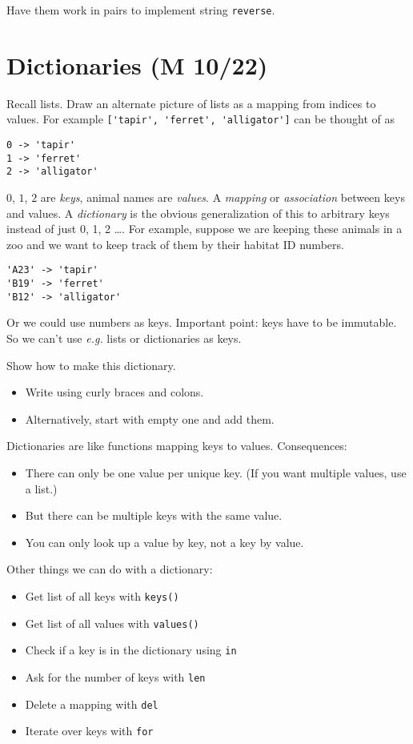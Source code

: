 \documentclass{article}
\newcommand{\eg}{\emph{e.g.}\xspace}
\begin{document}
Have them work in pairs to implement string \texttt{reverse}.

\newpage
\section{Dictionaries (M 10/22)}

Recall lists.  Draw an alternate picture of lists as a mapping from
indices to values. For example \verb|['tapir', 'ferret', 'alligator']|
can be thought of as
\begin{verbatim}
0 -> 'tapir'
1 -> 'ferret'
2 -> 'alligator'
\end{verbatim}
$0$, $1$, $2$ are \emph{keys}, animal names are \emph{values}.  A
\emph{mapping} or \emph{association} between keys and values.  A
\emph{dictionary} is the obvious generalization of this to arbitrary
keys instead of just 0, 1, 2 \dots.  For example, suppose we are
keeping these animals in a zoo and we want to keep track of them by
their habitat ID numbers.
\begin{verbatim}
'A23' -> 'tapir'
'B19' -> 'ferret'
'B12' -> 'alligator'
\end{verbatim}
Or we could use numbers as keys.  Important point: keys have to be
immutable.  So we can't use \eg lists or dictionaries as keys.

Show how to make this dictionary.
\begin{itemize}
\item Write using curly braces and colons.
\item Alternatively, start with empty one and add them.
\end{itemize}

Dictionaries are like functions mapping keys to values.  Consequences:
\begin{itemize}
\item There can only be one value per unique key.  (If you want
  multiple values, use a list.)
\item But there can be multiple keys with the same value.
\item You can only look up a value by key, not a key by value.
\end{itemize}

Other things we can do with a dictionary:
\begin{itemize}
\item Get list of all keys with \verb|keys()|
\item Get list of all values with \verb|values()|
\item Check if a key is in the dictionary using \verb|in|
\item Ask for the number of keys with \verb|len|
\item Delete a mapping with \verb|del|
\item Iterate over keys with \verb|for|
\end{itemize}
\end{document}

